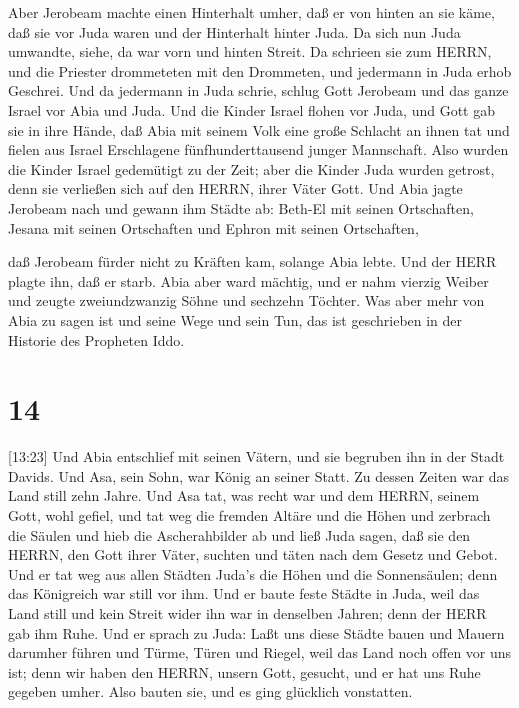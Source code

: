  Aber Jerobeam machte einen Hinterhalt umher, daß er von
hinten an sie käme, daß sie vor Juda waren und der Hinterhalt hinter
Juda.  Da sich nun Juda umwandte, siehe, da war vorn und
hinten Streit. Da schrieen sie zum HERRN, und die Priester drommeteten
mit den Drommeten,  und jedermann in Juda erhob Geschrei.
Und da jedermann in Juda schrie, schlug Gott Jerobeam und das ganze
Israel vor Abia und Juda.  Und die Kinder Israel flohen vor
Juda, und Gott gab sie in ihre Hände,  daß Abia mit seinem
Volk eine große Schlacht an ihnen tat und fielen aus Israel Erschlagene
fünfhunderttausend junger Mannschaft.  Also wurden die
Kinder Israel gedemütigt zu der Zeit; aber die Kinder Juda wurden
getrost, denn sie verließen sich auf den HERRN, ihrer Väter Gott.
 Und Abia jagte Jerobeam nach und gewann ihm Städte ab:
Beth-El mit seinen Ortschaften, Jesana mit seinen Ortschaften und Ephron
mit seinen Ortschaften,

 daß Jerobeam fürder nicht zu Kräften kam, solange Abia
lebte. Und der HERR plagte ihn, daß er starb.  Abia aber
ward mächtig, und er nahm vierzig Weiber und zeugte zweiundzwanzig Söhne
und sechzehn Töchter.  Was aber mehr von Abia zu sagen ist
und seine Wege und sein Tun, das ist geschrieben in der Historie des
Propheten Iddo.

\hypertarget{section-13}{%
\section{14}\label{section-13}}

 {[}13:23{]} Und Abia entschlief mit seinen Vätern, und sie
begruben ihn in der Stadt Davids. Und Asa, sein Sohn, war König an
seiner Statt. Zu dessen Zeiten war das Land still zehn Jahre.
 Und Asa tat, was recht war und dem HERRN, seinem Gott, wohl
gefiel,  und tat weg die fremden Altäre und die Höhen und
zerbrach die Säulen und hieb die Ascherahbilder ab  und ließ
Juda sagen, daß sie den HERRN, den Gott ihrer Väter, suchten und täten
nach dem Gesetz und Gebot.  Und er tat weg aus allen Städten
Juda's die Höhen und die Sonnensäulen; denn das Königreich war still vor
ihm.  Und er baute feste Städte in Juda, weil das Land still
und kein Streit wider ihn war in denselben Jahren; denn der HERR gab ihm
Ruhe.  Und er sprach zu Juda: Laßt uns diese Städte bauen
und Mauern darumher führen und Türme, Türen und Riegel, weil das Land
noch offen vor uns ist; denn wir haben den HERRN, unsern Gott, gesucht,
und er hat uns Ruhe gegeben umher. Also bauten sie, und es ging
glücklich vonstatten.

